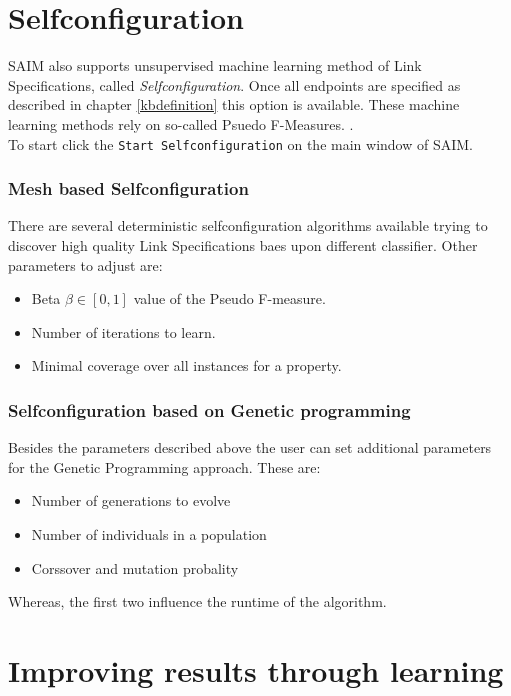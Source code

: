 \documentclass[oneside,a4paper,12pt]{memoir}
\begin{document}
\chapter{Selfconfiguration}
\label{selfconfig}
SAIM also supports unsupervised machine learning method of Link Specifications, called \emph{Selfconfiguration}. Once all endpoints are specified as described in chapter \ref{kbdefinition} this option is available. These machine learning methods rely on so-called Psuedo F-Measures. .\\
To start click the \texttt{Start Selfconfiguration} on the main window of SAIM.
\subsection{Mesh based Selfconfiguration}
There are several deterministic selfconfiguration algorithms available trying to discover high quality Link Specifications baes upon different classifier. Other parameters to adjust are:

\begin{itemize}
	\item Beta $\beta \in [0,1]$ value of the Pseudo F-measure.
	\item Number of iterations to learn.
	\item Minimal coverage over all instances for a property.
\end{itemize}

\subsection{Selfconfiguration based on Genetic programming}
Besides the parameters described above the user can set additional parameters for the Genetic Programming approach. These are:
\begin{itemize}
	\item Number of generations to evolve
	\item Number of individuals in a population
	\item Corssover and mutation probality
\end{itemize}
Whereas, the first two influence the runtime of the algorithm.

\chapter{Improving results through learning}
\label{learning}
\end{document}
